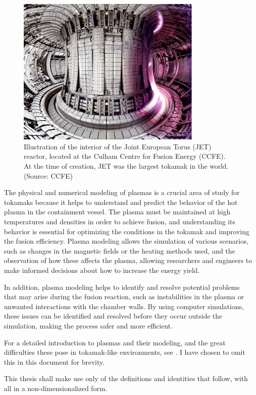     \begin{figure}[!ht]
        \centering
        \includegraphics[width = 0.8\textwidth]{0 - introduction/images/JET.jpg}
        \caption{Illustration of the interior of the Joint European Torus (JET) reactor, located at the Culham Centre for Fusion Energy (CCFE). At the time of creation, JET was the largest tokamak in the world. (Source: CCFE)}
    \end{figure}

    \shortline

    The physical and numerical modeling of plasmas is a crucial area of study for tokamaks because it helps to understand and predict the behavior of the hot plasma in the containment vessel. The plasma must be maintained at high temperatures and densities in order to achieve fusion, and understanding its behavior is essential for optimizing the conditions in the tokamak and improving the fusion efficiency. Plasma modeling allows the simulation of various scenarios, such as changes in the magnetic fields or the heating methods used, and the observation of how these affects the plasma, allowing researchers and engineers to make informed decisions about how to increase the energy yield.

    In addition, plasma modeling helps to identify and resolve potential problems that may arise during the fusion reaction, such as instabilities in the plasma or unwanted interactions with the chamber walls. By using computer simulations, these issues can be identified and resolved before they occur outside the simulation, making the process safer and more efficient.
    
    \shortline

    \begin{remark}
        For a detailed introduction to plasmas and their modeling, and the great difficulties these pose in tokamak-like environments, see \cite{addendum_I}. I have chosen to omit this in this document for brevity.
        
        This thesis shall make use only of the definitions and identities that follow, with all in a non-dimensionalized form.
    \end{remark}

